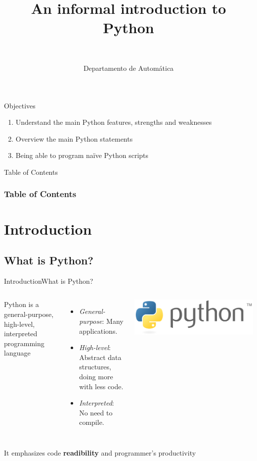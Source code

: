 \documentclass[10pt,compress]{beamer} %
\title[An informal introduction to Python]{An informal introduction to Python}
\author{\asignatura\\\carrera}
\institute{}
\date{Departamento de Automática}
\begin{document}
{\titlepageBlue
    \begin{frame}
        \titlepage
    \end{frame}
}

\begin{frame}[plain]{}
	\begin{block}{Objectives}
		\begin{enumerate}
		\item Understand the main Python features, strengths and weaknesses
		\item Overview the main Python statements
		\item Being able to program na\"ive Python scripts
		\end{enumerate}
	\end{block}
\end{frame}

{
\begin{frame}[shrink]{Table of Contents}
 \frametitle{Table of Contents}
 \tableofcontents
\end{frame}
}

\section{Introduction}
\subsection{What is Python?}

\begin{frame}{Introduction}{What is Python?}
    \begin{columns}
			Python is a general-purpose, high-level, interpreted programming language
				\begin{itemize}
				\item \textit{General-purpose}: Many applications.
				\item \textit{High-level}: Abstract data structures, doing more with less code.
				\item \textit{Interpreted}: No need to compile.
				\end{itemize}

		\centering \hspace{-2cm} \includegraphics[width=1.8\linewidth]{figs/python.png}
	\end{columns}
	\bigskip
			It emphasizes code \textbf{readibility} and programmer's productivity\\
\end{frame}
\end{document}
